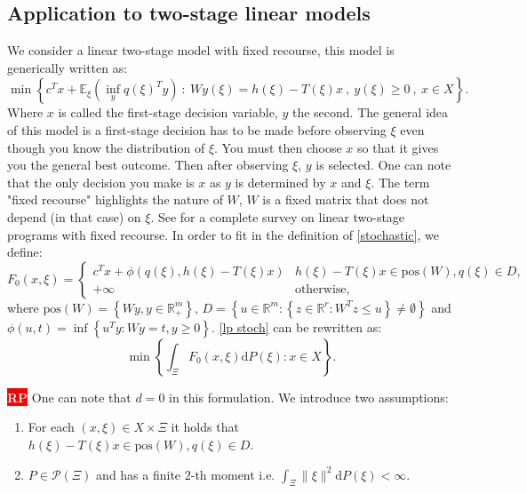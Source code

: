 \documentclass{amsart}
\newcommand{\nb}[3]{
		{\colorbox{#2}{\bfseries\sffamily\tiny\textcolor{white}{#1}}}
		{\textcolor{#2}{\text{$\blacktriangleright$}{\textcolor{#2}{#3}}\text{$\blacktriangleleft$}}}}
\newcommand{\rp}[1]{\nb{RP}{red}{#1}}
\newcommand{\RR}{\mathbb{R}}
\begin{document}
\subsection{Application to two-stage linear models}\label{two stage}
We consider a linear two-stage model with fixed recourse, this model is generically written as: 
\begin{equation}\label{lp stoch}
    \min\left\{c^Tx + \mathbb{E}_\xi\left(\inf_y q\left(\xi\right)^Ty \right)\: :\: Wy\left(\xi\right)=h\left(\xi\right)-T\left(\xi\right)x\:,\: y\left(\xi\right)\geq0\:,\: x\in X \right\}.
\end{equation}
Where $x$ is called the first-stage decision variable, $y$ the second. The general idea of this model is a first-stage decision has to be made before observing $\xi$ even though you know the distribution of $\xi$. You must then choose $x$ so that it gives you the general best outcome. Then after observing $\xi$, $y$ is selected. One can note that the only decision you make is $x$ as $y$ is determined by $x$ and $\xi$. The term "fixed recourse" highlights the nature of $W$, $W$ is a fixed matrix that does not depend (in that case) on $\xi$. See \cite{wets_stochastic_1974} for a complete survey on linear two-stage programs with fixed recourse. In order to fit in the definition of  \ref{stochastic}, we define:
$$
F_0\left(x,\xi\right)=\begin{cases} 
  c^Tx + \phi\left(q\left(\xi\right), h\left(\xi\right) -T\left(\xi\right)x\right) & h\left(\xi\right)-     T\left(\xi\right)x \in \text{pos}\left(W\right), q\left(\xi\right) \in D, \\
  +\infty & \text{otherwise},
\end{cases}
$$
where $\text{pos}(W)=\left\{Wy, y\in\RR_+^m\right\}$, $D=\left\{u\in\RR^m:\left\{z\in\RR^r:W^Tz \leq u\right\}\ne \emptyset\right\}$ and $\phi\left(u,t\right)=\inf\left\{ u^Ty : Wy=t, y\geq0\right\}$. \ref{lp stoch} can be rewritten as:
\begin{equation}
    \min\left\{\int_\Xi F_0\left(x,\xi\right)\text{d}P\left(\xi\right): x\in X\right\}. 
\end{equation}
\rp{i'll write down a proof later as it does not appear on the article}
One can note that $d=0$ in this formulation. We introduce two assumptions: 
\begin{enumerate}[label=(A\arabic*)]
    \item\label{h1} For each $\left(x,\xi\right)\in X\times \Xi$ it holds that $h\left(\xi\right)- T\left(\xi\right)x\in \text{pos}\left(W\right), q\left(\xi\right) \in D$.
    \item\label{h2} $P\in\mathcal{P}\left(\Xi\right)$ and has a finite $2$-th moment i.e. $\int_\Xi \lVert \xi\rVert^2\text{d}P\left(\xi\right) < \infty$.
\end{enumerate}
\end{document}
